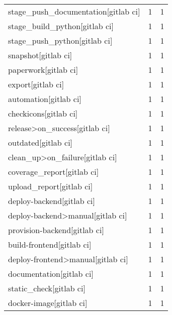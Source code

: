 \begin{tabular}{lrr}
stage\_push\_documentation[gitlab ci]        &                   1 &             1 \\
stage\_build\_python[gitlab ci]              &                   1 &             1 \\
stage\_push\_python[gitlab ci]               &                   1 &             1 \\
snapshot[gitlab ci]                        &                   1 &             1 \\
paperwork[gitlab ci]                       &                   1 &             1 \\
export[gitlab ci]                          &                   1 &             1 \\
automation[gitlab ci]                      &                   1 &             1 \\
checkicons[gitlab ci]                      &                   1 &             1 \\
release>on\_success[gitlab ci]              &                   1 &             1 \\
outdated[gitlab ci]                        &                   1 &             1 \\
clean\_up>on\_failure[gitlab ci]             &                   1 &             1 \\
coverage\_report[gitlab ci]                 &                   1 &             1 \\
upload\_report[gitlab ci]                   &                   1 &             1 \\
deploy-backend[gitlab ci]                  &                   1 &             1 \\
deploy-backend>manual[gitlab ci]           &                   1 &             1 \\
provision-backend[gitlab ci]               &                   1 &             1 \\
build-frontend[gitlab ci]                  &                   1 &             1 \\
deploy-frontend>manual[gitlab ci]          &                   1 &             1 \\
documentation[gitlab ci]                   &                   1 &             1 \\
static\_check[gitlab ci]                    &                   1 &             1 \\
docker-image[gitlab ci]                    &                   1 &             1 \\

\end{tabular}

